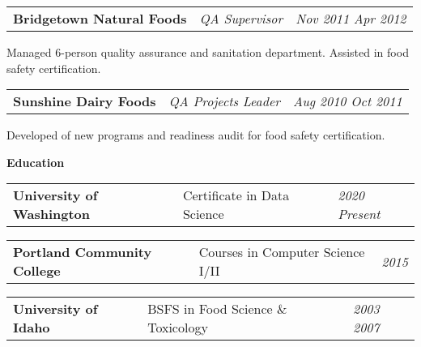 \documentclass[letterpaper,12pt]{article}[leftmargin=*]
\newcommand{\education}[2]{\vspace{6pt}
  \colorbox{Copper}{\color{white}#1\hspace{9pt}\raggedbottom\normalsize\textbf{#2\hspace{4pt}}}
}
\newcommand{\resumeSectionStart}{\begin{itemize}[leftmargin=0.1in]}
\newcommand{\resumeSectionEnd}{\end{itemize}}
\newcommand{\resumeExperience}[3]{
  \vspace{-3pt}
  \item[]
    \begin{tabularx}{0.97\textwidth}{>{\raggedright}X >{\raggedright\arraybackslash}X >{\raggedleft\arraybackslash}X}
      \textbf{\color{primary}#1} & \textit{\color{accent}#2} & \textit{\color{accent}\small#3} \\
    \end{tabularx}
}
\newcommand{\resumeEducation}[3]{
  \vspace{-1pt}
  \item[]
    \begin{tabularx}{0.97\textwidth}[t]{>{\raggedright}X >{\raggedright\arraybackslash}X >{\raggedleft\arraybackslash}X}
      \textbf{\color{primary}#1} & {\small#2} & \textit{\color{accent}\small#3} \\
    \end{tabularx}
  \vspace{-3pt}
}
\begin{document}
\resumeSectionStart{
  \resumeExperience{Bridgetown Natural Foods}{QA Supervisor}{Nov 2011 \textemdash{} Apr 2012}
  Managed 6-person quality assurance and sanitation department. Assisted in food safety certification.
}
\vspace{-6pt}
\resumeSectionEnd{}

\resumeSectionStart{
  \resumeExperience{Sunshine Dairy Foods}{QA Projects Leader}{Aug 2010 \textemdash{} Oct 2011}
  Developed of new programs and readiness audit for food safety certification.
}
\vspace{-6pt}
\resumeSectionEnd{}




\education{\faGraduationCap}{Education}

\resumeSectionStart{

  \resumeEducation{University of Washington}{Certificate in Data Science}{2020 \textemdash{} Present}


  \resumeEducation{Portland Community College}{Courses in Computer Science I/II}{2015}

  \resumeEducation{University of Idaho}{BSFS in Food Science \& Toxicology}{2003 \textemdash{} 2007}

}
\resumeSectionEnd{}
\end{document}
